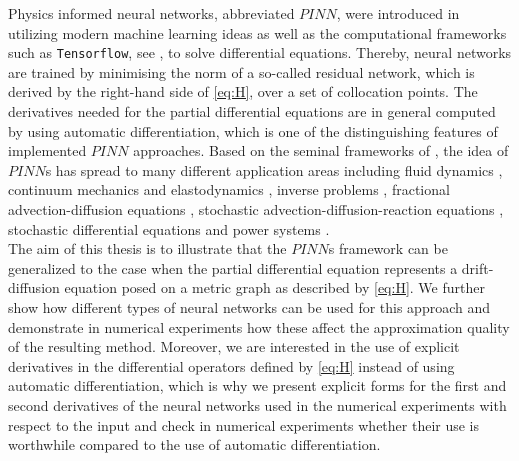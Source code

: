 Physics informed neural networks, abbreviated $PINN$, were introduced in \cite{RaissiPerdikarisKarniadakisPart1:2017} utilizing modern machine learning ideas as well as the computational frameworks such as \lstinline!Tensorflow!, see \cite{TensorFlow}, to solve differential equations. Thereby, neural networks are trained by minimising the norm of a so-called residual network, which is derived by the right-hand side of \cref{eq:H}, over a set of collocation points. The derivatives needed for the partial differential equations are in general computed by using automatic differentiation, which is one of the distinguishing features of implemented $PINN$ approaches. Based on the seminal frameworks of \cite{RaissiPerdikarisKarniadakis:2019,lu2021deepxde}, the idea of $PINN$s has spread to many different application areas \cite{zhu2019physics,mao2020physics,jin2021nsfnets,sahli2020physics}including fluid dynamics \cite{raissi2018hidden,MAO2020112789,lye2020deep,magiera2020constraint,wessels2020neural}, continuum mechanics and elastodynamics \cite{haghighat2020deep,nguyen2020deep,rao2020physics}, inverse problems \cite{meng2020composite,jagtap2020conservative}, fractional advection-diffusion equations \cite{pang2019fpinns}, stochastic advection-diffusion-reaction equations \cite{chen2019learning}, stochastic differential equations \cite{yang2020physics} and power systems \cite{misyris2020physics}. \\
The aim of this thesis is to illustrate that the $PINN$s framework can be generalized to the case when the partial differential equation represents a drift-diffusion equation posed on a metric graph as described by \cref{eq:H}. We further show how different types of neural networks can be used for this approach and demonstrate in numerical experiments how these affect the approximation quality of the resulting method. Moreover, we are interested in the use of explicit derivatives in the differential operators defined by \cref{eq:H} instead of using automatic differentiation, which is why we present explicit forms for the first and second derivatives of the neural networks used in the numerical experiments with respect to the input and check in numerical experiments whether their use is worthwhile compared to the use of automatic differentiation. \\

